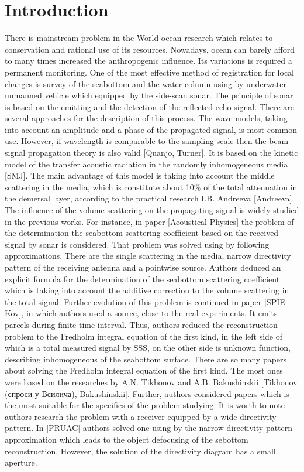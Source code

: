 \documentclass{procDDs}
\begin{document}
\section{Introduction}
There is mainstream problem in the World ocean research which relates to conservation and rational use of its resources. Nowadays, ocean can barely afford to many times increased the anthropogenic influence. Its variations is required a permanent monitoring. One of the most effective method of registration for local changes is survey of the seabottom and the water column using by underwater unmanned vehicle which equipped by the side-scan sonar. The principle of sonar is based on the emitting and the detection of the reflected echo signal. There are several approaches for the description of this process. The wave models, taking into account an amplitude and a phase of the propagated signal, is most common use. However, if wavelength is comparable to the sampling scale then the beam signal propagation theory is also valid [Quanjo, Turner]. It is based on the kinetic model of the transfer acoustic radiation in the randomly inhomogeneous media [SMJ]. The main advantage of this model is taking into account the middle scattering in the media, which is constitute about 10\% of the total attenuation in the demersal layer, according to the practical research I.B. Andreeva [Andreeva]. The influence of the volume scattering on the propagating signal is widely studied in the previous works. For instance, in paper [Acoustical Physics] the problem of the determination the seabottom scattering coefficient based on the received signal by sonar is considered. That problem was solved using by following approximations. There are the single scattering in the media, narrow directivity pattern of the receiving antenna and a pointwise source. Authors deduced an explicit formula for the determination of the seabottom scattering coefficient which is taking into account the additive correction to the volume scattering in the total signal. Further evolution of this problem is continued in paper [SPIE - Kov], in which authors used a source, close to the real experiments. It emits parcels during finite time interval. Thus, authors reduced the reconstruction problem to the Fredholm integral equation of the first kind, in the left side of which is a total measured signal by SSS,  on the other side is unknown function, describing inhomogeneous of the seabottom surface. 
There are so many papers about solving the Fredholm integral equation of the first kind. The most ones were based on the researches by A.N. Tikhonov and A.B. Bakushinskii [Tikhonov (спроси у Всилича), Bakushinskii]. Further, authors considered papers which is the most suitable for the specifics of the problem studying. It is worth to note authors research the problem with a receiver equipped by  a wide directivity pattern. In [PRUAC] authors solved one using by the narrow directivity pattern approximation which leads to the object defocusing of the sebottom reconstruction. However, the solution of the directivity diagram has a small aperture.
\end{document}
